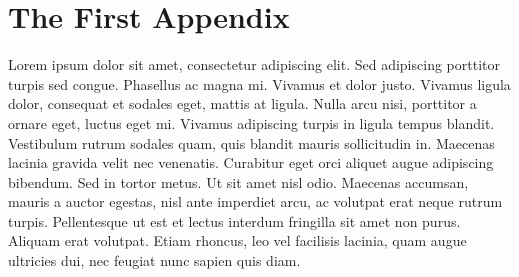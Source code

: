 \chapter{The First Appendix}

Lorem ipsum dolor sit amet, consectetur adipiscing elit. Sed adipiscing porttitor turpis sed congue. Phasellus ac magna mi. Vivamus et dolor justo. Vivamus ligula dolor, consequat et sodales eget, mattis at ligula. Nulla arcu nisi, porttitor a ornare eget, luctus eget mi. Vivamus adipiscing turpis in ligula tempus blandit. Vestibulum rutrum sodales quam, quis blandit mauris sollicitudin in. Maecenas lacinia gravida velit nec venenatis. Curabitur eget orci aliquet augue adipiscing bibendum. Sed in tortor metus. Ut sit amet nisl odio. Maecenas accumsan, mauris a auctor egestas, nisl ante imperdiet arcu, ac volutpat erat neque rutrum turpis. Pellentesque ut est et lectus interdum fringilla sit amet non purus. Aliquam erat volutpat. Etiam rhoncus, leo vel facilisis lacinia, quam augue ultricies dui, nec feugiat nunc sapien quis diam.
